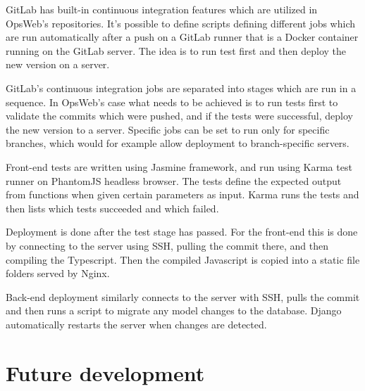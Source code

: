 GitLab has built-in continuous integration features which are utilized in OpsWeb's repositories. It's possible to define scripts defining different jobs which are run automatically after a push on a GitLab runner that is a Docker container running on the GitLab server. The idea is to run test first and then deploy the new version on a server.

GitLab's continuous integration jobs are separated into stages which are run in a sequence. In OpsWeb's case what needs to be achieved is to run tests first to validate the commits which were pushed, and if the tests were successful, deploy the new version to a server. Specific jobs can be set to run only for specific branches, which would for example allow deployment to branch-specific servers.

Front-end tests are written using Jasmine framework, and run using Karma test runner on PhantomJS headless browser. The tests define the expected output from functions when given certain parameters as input. Karma runs the tests and then lists which tests succeeded and which failed.

Deployment is done after the test stage has passed. For the front-end this is done by connecting to the server using SSH, pulling the commit there, and then compiling the Typescript. Then the compiled Javascript is copied into a static file folders served by Nginx.

Back-end deployment similarly connects to the server with SSH, pulls the commit and then runs a script to migrate any model changes to the database. Django automatically restarts the server when changes are detected.
\section{Future development}